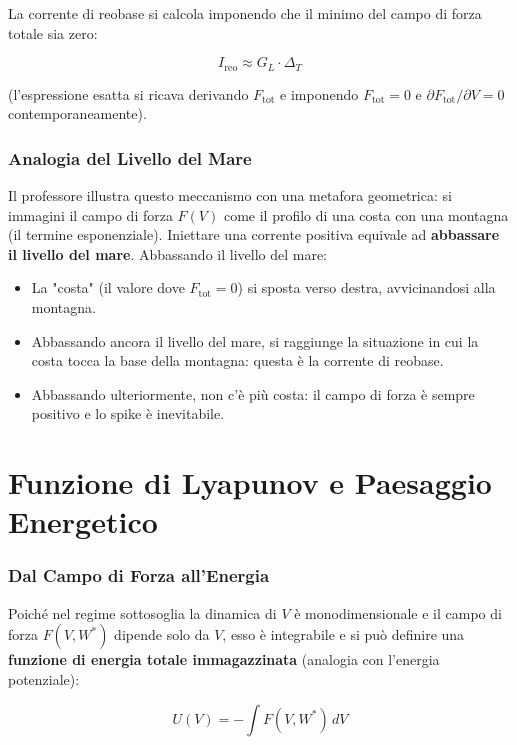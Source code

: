 La corrente di reobase si calcola imponendo che il minimo del campo di forza totale sia zero:

\begin{equation}
I_{\text{reo}} \approx G_L \cdot \Delta_T
\end{equation}

(l'espressione esatta si ricava derivando $F_{\text{tot}}$ e imponendo $F_{\text{tot}} = 0$ e $\partial F_{\text{tot}}/\partial V = 0$ contemporaneamente).

\subsubsection{Analogia del Livello del Mare}

Il professore illustra questo meccanismo con una metafora geometrica: si immagini il campo di forza $F(V)$ come il profilo di una costa con una montagna (il termine esponenziale). Iniettare una corrente positiva equivale ad \textbf{abbassare il livello del mare}. Abbassando il livello del mare:
\begin{itemize}
    \item La "costa" (il valore dove $F_{\text{tot}} = 0$) si sposta verso destra, avvicinandosi alla montagna.
    \item Abbassando ancora il livello del mare, si raggiunge la situazione in cui la costa tocca la base della montagna: questa è la corrente di reobase.
    \item Abbassando ulteriormente, non c'è più costa: il campo di forza è sempre positivo e lo spike è inevitabile.
\end{itemize}



\section{Funzione di Lyapunov e Paesaggio Energetico}

\subsubsection{Dal Campo di Forza all'Energia}

Poiché nel regime sottosoglia la dinamica di $V$ è monodimensionale e il campo di forza $F(V, W^*)$ dipende solo da $V$, esso è integrabile e si può definire una \textbf{funzione di energia totale immagazzinata} (analogia con l'energia potenziale):

\begin{equation}
U(V) = -\int F(V, W^*) \, dV
\end{equation}

